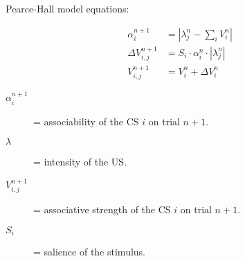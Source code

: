 \documentclass[varwidth]{standalone}
\begin{document}
Pearce-Hall model equations:


\begin{align}
\alpha_i^{n+1} &= \left| \lambda_j^{n} - \sum_i V^n_i \right| \label{pearce_hall_alpha} \\
\Delta V^{n+1}_{i,j} &= S_i \cdot \alpha^n_i \cdot \left| \lambda_j^n \right| \label{pearce_hall_deltav} \\
V^{n+1}_{i,j} &= V^n_i + \Delta V_i^n \label{pearce_hall}
\end{align}


\begin{description}
	\item[$\alpha_i^{n + 1}$] = associability of the CS $i$ on trial $n + 1$.
	\item[$\lambda$] = intensity of the US.
	\item[$V_{i,j}^{n + 1}$] = associative strength of the CS $i$ on trial $n + 1$.
	\item[$S_i$] = salience of the stimulus.
\end{description} \vspace{10pt}
\end{document}
